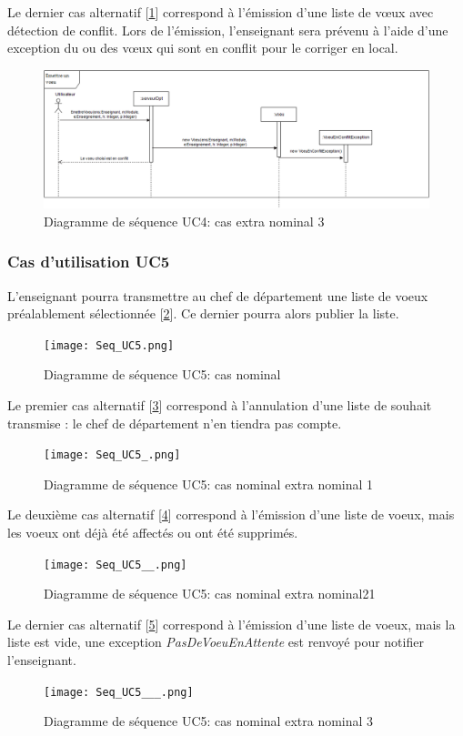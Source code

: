 \documentclass[a4paper,11pt]{article}
\newcommand{\br}{\\\mbox{}}
\begin{document}
Le dernier cas alternatif [\ref{DUC4___}] correspond à l'émission d'une liste de vœux avec détection de conflit. Lors de l'émission, l'enseignant sera prévenu à l'aide d'une exception du ou des vœux qui sont en conflit pour le corriger en local.
\begin{figure}
\centering
\includegraphics[scale=0.5]{Seq_UC4___.png}
\caption{Diagramme de séquence UC4: cas extra nominal 3}
\label{DUC4___}
\end{figure}

\subsubsection{Cas d’utilisation UC5}
L'enseignant pourra transmettre au chef de département une liste de voeux préalablement sélectionnée [\ref{DUC5}]. Ce dernier pourra alors publier la liste.\br
\begin{figure}
\centering
\texttt{[image: Seq\_UC5.png]}
\caption{Diagramme de séquence UC5: cas nominal}
\label{DUC5}
\end{figure}
Le premier cas alternatif [\ref{DUC5_}] correspond à l'annulation d'une liste de souhait transmise : le chef de département n'en tiendra pas compte.\br
\begin{figure}
\centering
\texttt{[image: Seq\_UC5\_.png]}
\caption{Diagramme de séquence UC5: cas nominal extra nominal 1}
\label{DUC5_}
\end{figure}
Le deuxième cas alternatif [\ref{DUC5__}] correspond à l'émission d'une liste de voeux, mais les voeux ont déjà été affectés ou ont été supprimés.\br
\begin{figure}
\centering
\texttt{[image: Seq\_UC5\_\_.png]}
\caption{Diagramme de séquence UC5: cas nominal extra nominal21}
\label{DUC5__}
\end{figure}
Le dernier cas alternatif [\ref{DUC5___}] correspond à l'émission d'une liste de voeux, mais la liste est vide, une exception \textit{PasDeVoeuEnAttente} est renvoyé pour notifier l'enseignant.\br
\begin{figure}
\centering
\texttt{[image: Seq\_UC5\_\_\_.png]}
\caption{Diagramme de séquence UC5: cas nominal extra nominal 3}
\label{DUC5___}
\end{figure}
\end{document}
